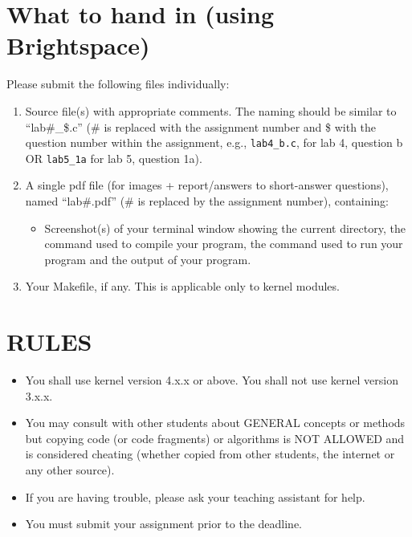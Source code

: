 \documentclass{article}
\begin{document}
\section*{What to hand in (using Brightspace)}

Please submit the following files individually:

\begin{enumerate}
    \item Source file(s) with appropriate comments. The naming should be similar to “lab\#\_\$.c” (\# is replaced with the assignment number and \$ with the question number within the assignment, e.g., \texttt{lab4\_b.c}, for lab 4, question b OR \texttt{lab5\_1a} for lab 5, question 1a).
    \item A single pdf file (for images + report/answers to short-answer questions), named “lab\#.pdf” (\# is replaced by the assignment number), containing:
    \begin{itemize}
        \item Screenshot(s) of your terminal window showing the current directory, the command used to compile your program, the command used to run your program and the output of your program.
    \end{itemize}
    \item Your Makefile, if any. This is applicable only to kernel modules.
\end{enumerate}

\section*{RULES}

\begin{itemize}
    \item You shall use kernel version 4.x.x or above. You shall not use kernel version 3.x.x.
    \item You may consult with other students about GENERAL concepts or methods but copying code (or code fragments) or algorithms is NOT ALLOWED and is considered cheating (whether copied from other students, the internet or any other source).
    \item If you are having trouble, please ask your teaching assistant for help.
    \item You must submit your assignment prior to the deadline.
\end{itemize}
\end{document}
